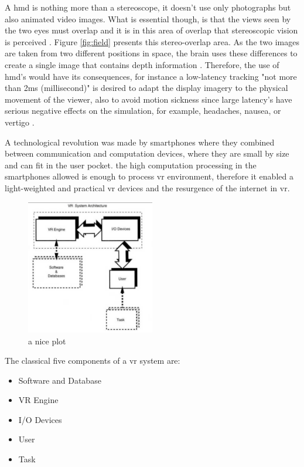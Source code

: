A \acrshort{hmd} is nothing more than a stereoscope, it doesn't use only photographs but also animated
video images. What is essential though, is that the views seen by the two eyes
must overlap and it is in this area of overlap that stereoscopic vision is perceived \citep{Vince2011}.
Figure \ref{fig:field} presents this stereo-overlap area. As the two images are taken from two different positions in space, the brain uses these
differences to create a single image that contains depth information \citep{Vince2011}. Therefore, the use of \acrshort{hmd}'s would have its consequences, for instance a low-latency tracking "not more than 2ms (millisecond)" is desired to adapt the display imagery to the physical movement of the viewer, also to avoid motion sickness since large latency's have serious negative effects on the simulation, for example, headaches, nausea, or vertigo \citep{burdea2017virtual, Vince2011, Steinicke2016}.

A technological revolution was made by smartphones where they combined between communication and computation devices, where they are small by size and can fit in the user pocket. the high computation processing in the smartphones allowed is enough to process \acrshort{vr} environment, therefore it enabled a light-weighted and practical \acrshort{vr} devices and the resurgence of the internet in \acrshort{vr}. 



\begin{figure}[ht]
    \centering
    \includegraphics[width=0.50\textwidth]{images/VR.png}
    \caption{a nice plot}
    \label{fig:mesh1}
\end{figure}




The classical five components of a \acrshort{vr} system are:
\begin{itemize}
  \item Software and Database
  \item VR Engine
  \item I/O Devices
  \item User
  \item Task
\end{itemize}


